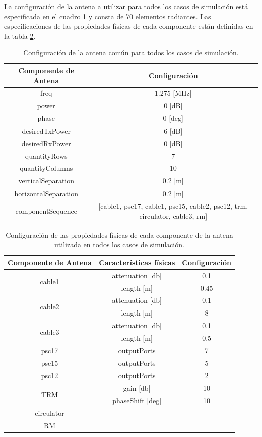 La configuración de la antena a utilizar para todos los casos de simulación está especificada en el cuadro
\ref{tab:configurationUsed} y consta de 70 elementos radiantes. Las especificaciones de las propiedades físicas de cada
componente están definidas en la tabla \ref{tab:configurationOfComponents}.
\begin{table}[H]
  \footnotesize
  \centering
  \begin{tabular}{|c|c|}
	\hline
	\textbf{Componente de Antena} & \textbf{Configuración} \tabularnewline \hline 
	freq &  1.275 [MHz] \tabularnewline\hline 
	power & 0 [dB] \tabularnewline \hline 
	phase & 0 [deg] \tabularnewline \hline 
	desiredTxPower & 6 [dB] \tabularnewline \hline 
	desiredRxPower & 0 [dB] \tabularnewline \hline 
	quantityRows & 7 \tabularnewline \hline 
	quantityColumns & 10 \tabularnewline \hline 
	verticalSeparation & 0.2 [m] \tabularnewline \hline 
	horizontalSeparation & 0.2 [m] \tabularnewline \hline 
	componentSequence & [cable1, psc17, cable1, psc15, cable2, psc12, trm, circulator, cable3, rm] \tabularnewline \hline 
  \end{tabular}
  \caption{Configuración de la antena común para todos los casos de simulación.}
  \label{tab:configurationUsed}
\end{table}
\begin{table}[H]
  \footnotesize
  \centering
  \begin{tabular}{|c|c|c|}
	\hline
	\textbf{Componente de Antena} & \textbf{Características físicas} & \textbf{Configuración} \tabularnewline \hline 
	\multirow{2}{*}{cable1} &  attenuation [db] & 0.1\tabularnewline \cline{2-3}
	 & length [m] & 0.45\tabularnewline \hline 
	\multirow{2}{*}{cable2} &  attenuation [db] & 0.1\tabularnewline \cline{2-3}
	 & length [m] & 8\tabularnewline \hline 
	\multirow{2}{*}{cable3} &  attenuation [db] & 0.1\tabularnewline \cline{2-3}
	 & length [m] & 0.5\tabularnewline \hline 
	psc17 & outputPorts & 7\tabularnewline \hline
	psc15 & outputPorts & 5\tabularnewline \hline
	psc12 & outputPorts & 2\tabularnewline \hline
	\multirow{2}{*}{TRM} & gain [db] & 10\tabularnewline \cline{2-3}
	 & phaseShift [deg] & 10\tabularnewline \hline 
	circulator & & \tabularnewline \hline 
	RM & & \tabularnewline \hline 
  \end{tabular}
  \caption{Configuración de las propiedades físicas de cada componente de la antena utilizada en todos los casos de simulación.}
  \label{tab:configurationOfComponents}
\end{table}

